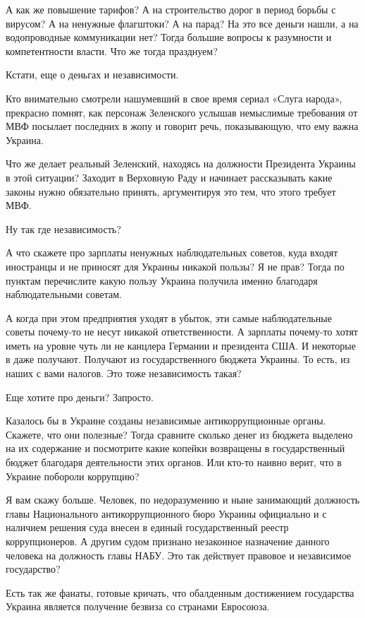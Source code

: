 А как же повышение тарифов? А на строительство дорог в период борьбы с вирусом?
А на ненужные флагштоки? А на парад? На это все деньги нашли, а на
водопроводные коммуникации нет? Тогда большие вопросы к разумности и
компетентности власти. Что же тогда празднуем?

Кстати, еще о деньгах и независимости.

Кто внимательно смотрели нашумевший в свое время сериал «Слуга народа»,
прекрасно помнят, как персонаж Зеленского услышав немыслимые требования от МВФ
посылает последних в жопу и говорит речь, показывающую, что ему важна Украина.

Что же делает реальный Зеленский, находясь на должности Президента Украины в
этой ситуации? Заходит в Верховную Раду и начинает рассказывать какие законы
нужно обязательно принять, аргументируя это тем, что этого требует МВФ.

Ну так где независимость?

А что скажете про зарплаты ненужных наблюдательных советов, куда входят
иностранцы и не приносят для Украины никакой пользы? Я не прав? Тогда по
пунктам перечислите какую пользу Украина получила именно благодаря
наблюдательными советам.

А когда при этом предприятия уходят в убыток, эти самые наблюдательные советы
почему-то не несут никакой ответственности. А зарплаты почему-то хотят иметь на
уровне чуть ли не канцлера Германии и президента США. И некоторые в даже
получают. Получают из государственного бюджета Украины. То есть, из наших с
вами налогов. Это тоже независимость такая?

Еще хотите про деньги? Запросто.

Казалось бы в Украине созданы независимые антикоррупционные органы. Скажете,
что они полезные? Тогда сравните сколько денег из бюджета выделено на их
содержание и посмотрите какие копейки возвращены в государственный бюджет
благодаря деятельности этих органов. Или кто-то наивно верит, что в Украине
побороли коррупцию?

Я вам скажу больше. Человек, по недоразумению и ныне занимающий должность главы
Национального антикоррупционного бюро Украины официально и с наличием решения
суда внесен в единый государственный реестр коррупционеров. А другим судом
признано незаконное назначение данного человека на должность главы НАБУ. Это
так действует правовое и независимое государство?

Есть так же фанаты, готовые кричать, что обалденным достижением государства
Украина является получение безвиза со странами Евросоюза.

